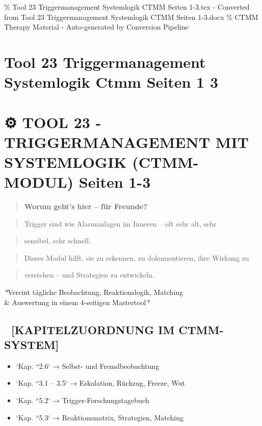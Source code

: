 \% Tool 23 Triggermanagement Systemlogik CTMM Seiten 1-3.tex - Converted from Tool 23 Triggermanagement Systemlogik CTMM Seiten 1-3.docx
\% CTMM Therapy Material - Auto-generated by Conversion Pipeline

\section{Tool 23 Triggermanagement Systemlogik Ctmm Seiten 1 3}
\label{sec:tool-23-triggermanagement-systemlogik-ctmm-seiten-1-3}

\section{⚙️ \textbf{TOOL 23 - TRIGGERMANAGEMENT MIT SYSTEMLOGIK (\textcolor{ctmmBlue}{CTMM}-MODUL) Seiten 1-3}}

\begin{quote}
\textcolor{ctmmPurple}{\faBrain} \textbf{Worum geht's hier -- für Freunde?}\
\end{quote}
\begin{quote}
\textcolor{ctmmRed}{Trigger} sind wie Alarmanlagen im Inneren -- oft sehr alt, sehr
\end{quote}
\begin{quote}
sensibel, sehr schnell.\
\end{quote}
\begin{quote}
Dieses Modul hilft, sie zu erkennen, zu dokumentieren, ihre Wirkung zu
\end{quote}
\begin{quote}
verstehen -- und Strategien zu entwickeln.
\end{quote}

\textcolor{ctmmBlue}{\faPuzzlePiece} \textit{*}Vereint tägliche Beobachtung, Reaktionslogik, Matching \\&
Auswertung in einem 4-seitigen Mastertool\textit{*}

\subsection{📘 \textbf{[KAPITELZUORDNUNG IM \textcolor{ctmmBlue}{CTMM}-SYSTEM]}}

\begin{itemize}
\item   `Kap. ``2.6` → Selbst- und Fremdbeobachtung
\item   `Kap. ``3.1 -- 3.5` → Eskalation, Rückzug, Freeze, Wut
\item   `Kap. ``5.2` → Trigger-Forschungstagebuch
\item   `Kap. ``5.3` → Reaktionsmatrix, Strategien, Matching
\end{itemize}

